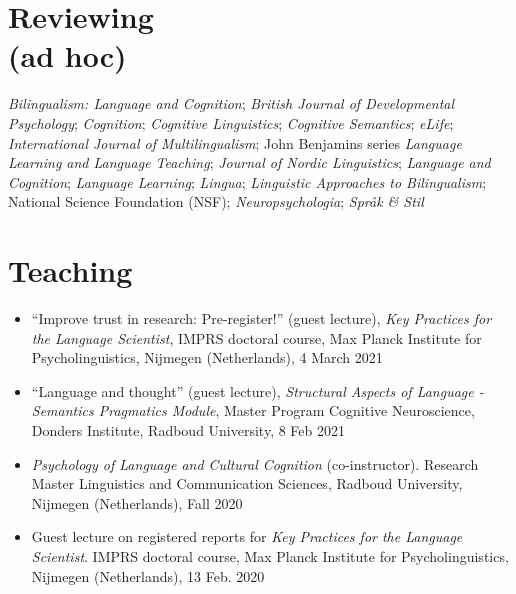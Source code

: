 \documentclass[margin, 11pt]{res} %
\begin{document}
\begin{resume}


\section{\sc Reviewing\\(ad hoc)}

\textit{Bilingualism: Language and Cognition};
\textit{British Journal of Developmental Psychology};
\textit{Cognition};
\textit{Cognitive Linguistics};
\textit{Cognitive Semantics};
\textit{eLife};
\textit{International Journal of Multilingualism};
John Benjamins series \textit{Language Learning and Language Teaching};
\textit{Journal of Nordic Linguistics};
\textit{Language and Cognition};
\textit{Language Learning};
\textit{Lingua};
\textit{Linguistic Approaches to Bilingualism};
National Science Foundation (NSF);
\textit{Neuropsychologia};
\textit{Spr\r{a}k \& Stil}






\section{\sc Teaching}

\begin{itemize}


\item ``Improve trust in research: Pre-register!'' (guest lecture), \emph{Key Practices for the Language Scientist}, IMPRS doctoral course, Max Planck Institute for Psycholinguistics, Nijmegen (Netherlands), 4 March 2021

\item ``Language and thought'' (guest lecture), \emph{Structural Aspects of Language - Semantics Pragmatics Module}, Master Program Cognitive Neuroscience, Donders Institute, Radboud University, 8 Feb 2021 

\item \textit{Psychology of Language and Cultural Cognition} (co-instructor). Research Master Linguistics and Communication Sciences, Radboud University, Nijmegen (Netherlands), Fall 2020

\item Guest lecture on registered reports for \textit{Key Practices for the Language Scientist}. IMPRS doctoral course, Max Planck Institute for Psycholinguistics, Nijmegen (Netherlands), 13 Feb. 2020


\end{itemize}
\end{resume}
\end{document}
